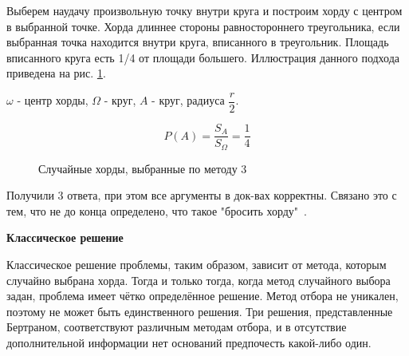 \begin{exmp}
	Выберем наудачу произвольную точку внутри круга и построим хорду с центром в выбранной точке. Хорда длиннее стороны равностороннего треугольника, если выбранная точка находится внутри круга, вписанного в треугольник. Площадь вписанного круга есть 1/4 от площади большего. Иллюстрация данного подхода приведена на рис. \ref{img:bertrand3}.
	
	$\omega$ - центр хорды, $\Omega$ - круг, $A$ - круг, радиуса $\dfrac{r}{2}$.
	
	\[ P(A) = \dfrac{S_A}{S_{\Omega}} = \dfrac{1}{4} \]
	
	\begin{figure}[h]
		\caption{Случайные хорды, выбранные по методу 3}
		\label{img:bertrand3}
	\end{figure}
	
	Получили 3 ответа, при этом все аргументы в док-вах корректны. Связано это с тем, что не до конца определено, что такое "бросить хорду"\ .
	
	\textbf{Классическое решение}
	
	\noindent Классическое решение проблемы, таким образом, зависит от метода, которым случайно выбрана хорда. Тогда и только тогда, когда метод случайного выбора задан, проблема имеет чётко определённое решение. Метод отбора не уникален, поэтому не может быть единственного решения. Три решения, представленные Бертраном, соответствуют различным методам отбора, и в отсутствие дополнительной информации нет оснований предпочесть какой-либо один.
	

\end{exmp}
